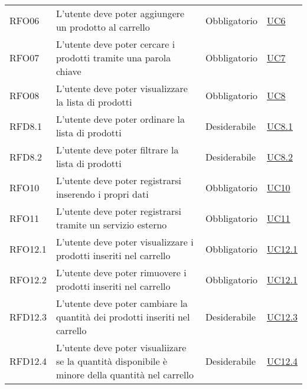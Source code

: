 \begin{center}
\begin{longtable}[!h]{p{50px} p{200px} p{100px} p{50px}}
        RFO06                                 & L'utente deve poter aggiungere un prodotto al carrello                                           & Obbligatorio             & \hyperref[sec:UC6]{UC6}       \\
        RFO07                                 & L'utente deve poter cercare i prodotti tramite una parola chiave                                 & Obbligatorio             & \hyperref[sec:UC7]{UC7}       \\
        RFO08                                 & L'utente deve poter visualizzare la lista di prodotti                                            & Obbligatorio             & \hyperref[sec:UC8]{UC8}       \\
        RFD8.1                                & L'utente deve poter ordinare la lista di prodotti                                                & Desiderabile             & \hyperref[sec:UC8]{UC8.1}     \\
        RFD8.2                                & L'utente deve poter filtrare la lista di prodotti                                                & Desiderabile             & \hyperref[sec:UC8]{UC8.2}     \\
        RFO10                                 & L'utente deve poter registrarsi inserendo i propri dati                                          & Obbligatorio             & \hyperref[sec:UC10]{UC10}     \\
        RFO11                                 & L'utente deve poter registrarsi tramite un servizio esterno                                      & Obbligatorio             & \hyperref[sec:UC11]{UC11}     \\
        RFO12.1                               & L'utente deve poter visualizzare i prodotti inseriti nel carrello                                & Obbligatorio             & \hyperref[sec:UC12.1]{UC12.1} \\
        RFO12.2                               & L'utente deve poter rimuovere i prodotti inseriti nel carrello                                   & Obbligatorio             & \hyperref[sec:UC12.1]{UC12.1} \\
        RFD12.3                               & L'utente deve poter cambiare la quantità dei prodotti inseriti nel carrello                      & Desiderabile             & \hyperref[sec:UC12.3]{UC12.3} \\
        RFD12.4                               & L'utente deve poter visualiizare se la quantità disponibile è minore della quantità nel carrello & Desiderabile             & \hyperref[sec:UC12.4]{UC12.4} \\

\end{longtable}
\end{center}
